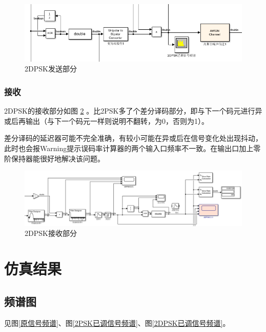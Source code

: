 \documentclass[11pt]{paper}
\begin{document}
\begin{figure}[ht]
    \centering
    \includegraphics[width=5.9in]{texture/design/2dpsk1.png}
    \caption{2DPSK发送部分}
    \label{2DPSK发送部分}
\end{figure}

\subsubsection{接收}

2DPSK的接收部分如图 \ref{2DPSK接收部分} 。比2PSK多了个差分译码部分，即与下一个码元进行异或后再输出（与下一个码元一样则说明不翻转，为0，否则为1）。

差分译码的延迟器可能不完全准确，有较小可能在异或后在信号变化处出现抖动，此时也会报Warning提示误码率计算器的两个输入口频率不一致。在输出口加上零阶保持器能很好地解决该问题。

\begin{figure}[ht]
    \centering
    \includegraphics[width=5.9in]{texture/design/2dpsk2.png}
    \caption{2DPSK接收部分}
    \label{2DPSK接收部分}
\end{figure}

\section{仿真结果}

\subsection{频谱图}

见图\ref{原信号频谱}、图\ref{2PSK已调信号频谱}、图\ref{2DPSK已调信号频谱}。
\end{document}
